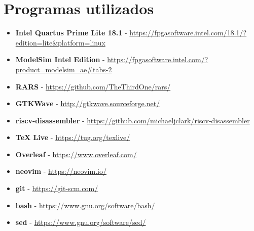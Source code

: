 \chapter{Programas utilizados}

\begin{itemize}
    \item \textbf{Intel Quartus Prime Lite 18.1} - \url{https://fpgasoftware.intel.com/18.1/?edition=lite&platform=linux}
    \item \textbf{ModelSim Intel Edition} - \url{https://fpgasoftware.intel.com/?product=modelsim_ae#tabs-2}
    \item \textbf{RARS} - \url{https://github.com/TheThirdOne/rars/}
    \item \textbf{GTKWave} - \url{http://gtkwave.sourceforge.net/}
    \item \textbf{riscv-disassembler} - \url{https://github.com/michaeljclark/riscv-disassembler}
    \item \textbf{TeX Live} - \url{https://tug.org/texlive/}
    \item \textbf{Overleaf} - \url{https://www.overleaf.com/}
    \item \textbf{neovim} - \url{https://neovim.io/}
    \item \textbf{git} - \url{https://git-scm.com/}
    \item \textbf{bash} - \url{https://www.gnu.org/software/bash/}
    \item \textbf{sed} - \url{https://www.gnu.org/software/sed/}
\end{itemize}

